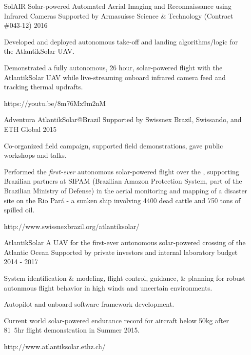 \begin{cventries}
\cvprojwideentry
  	{SolAIR} %
  	{Solar-powered Automated Aerial Imaging and Reconnaissance using Infrared Cameras} %
    {Supported by Armasuisse Science \& Technology (Contract \#043-12)} %
    {2016} %
    {
      \begin{cvitems} %
        \item {Developed and deployed autonomous take-off and landing algorithms/logic for the AtlantikSolar UAV.}
        \item {Demonstrated a fully autonomous, 26 hour, solar-powered flight with the AtlantikSolar UAV while live-streaming onboard infrared camera feed and tracking thermal updrafts.}
      \end{cvitems}
    } %
    {https://youtu.be/8m76Mx9m2nM} %
    {\showprojectdescriptions}
    
\cvprojwideentry
  	{Adventura AtlantikSolar@Brazil} %
  	{} %
    {Supported by Swissnex Brazil, Swissando, and ETH Global} %
    {2015} %
    {
      \begin{cvitems} %
        \item {Co-organized field campaign, supported field demonstrations, gave public workshops and talks.}
        \item {Performed the \emph{first-ever} autonomous solar-powered flight over the , supporting Brazilian partners at SIPAM (Brazilian Amazon Protection System, part of the Brazilian Ministry of Defense) in the aerial monitoring and mapping of a disaster site on the Rio Pará - a sunken ship involving 4400 dead cattle and 750 tons of spilled oil.}
      \end{cvitems}
    } %
    {http://www.swissnexbrazil.org/atlantiksolar/} %
    {\showprojectdescriptions}

\cvprojwideentry
  	{AtlantikSolar} %
  	{A UAV for the first-ever autonomous solar-powered crossing of the Atlantic Ocean} %
    {Supported by private investors and internal laboratory budget} %
    {2014 - 2017} %
    {
      \begin{cvitems} %
        \item {System identification \& modeling, flight control, guidance, \& planning for robust autonmous flight behavior in high winds and uncertain environments.}
        \item {Autopilot and onboard software framework development.}
        \item {Current world solar-powered endurance record for aircraft below \unit{50}{kg} after \unit{81.5}{hr} flight demonstration in Summer 2015.}
      \end{cvitems}
    } %
    {http://www.atlantiksolar.ethz.ch/} %
    {\showprojectdescriptions}


\end{cventries}

